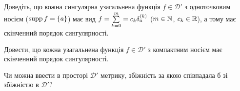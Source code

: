 \begin{exercise}
    Доведіть, що кожна сингулярна узагальнена функція $f \in \mathcal{D}'$ з одноточковим носієм ($\operatorname{supp} f = \{ a\}$) має вид
    $f = \sum\limits_{k=0}^{m} = c_k \delta_a^{(k)}$ ($m \in \mathbb{N}$, $c_k \in \mathbb{R}$), а тому має скінченний порядок сингулярності.
\end{exercise}
\begin{exercise*}
    Довести, що кожна узагальнена функція $f \in \mathcal{D}'$ з компактним носієм має скінченний порядок сингулярності.
\end{exercise*}
\begin{exercise*}
    Чи можна ввести в просторі $\mathcal{D}'$ метрику, збіжність за якою співпадала б зі збіжністю в $\mathcal{D}'$?
\end{exercise*}